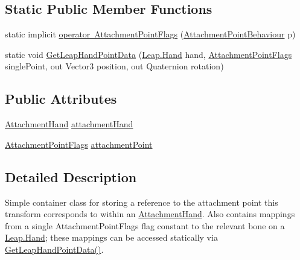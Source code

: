 \subsection*{Static Public Member Functions}
\begin{DoxyCompactItemize}
\item 
static implicit \mbox{\hyperlink{class_leap_1_1_unity_1_1_attachments_1_1_attachment_point_behaviour_af2b9cb4aa7bc97715ba572180d450538}{operator Attachment\+Point\+Flags}} (\mbox{\hyperlink{class_leap_1_1_unity_1_1_attachments_1_1_attachment_point_behaviour}{Attachment\+Point\+Behaviour}} p)
\item 
static void \mbox{\hyperlink{class_leap_1_1_unity_1_1_attachments_1_1_attachment_point_behaviour_a80f3e3a2fa250a6b955a50f471b4a498}{Get\+Leap\+Hand\+Point\+Data}} (\mbox{\hyperlink{class_leap_1_1_hand}{Leap.\+Hand}} hand, \mbox{\hyperlink{namespace_leap_1_1_unity_1_1_attachments_a4b32b38f722ad110fcd5a817256e09ab}{Attachment\+Point\+Flags}} single\+Point, out Vector3 position, out Quaternion rotation)
\end{DoxyCompactItemize}
\subsection*{Public Attributes}
\begin{DoxyCompactItemize}
\item 
\mbox{\hyperlink{class_leap_1_1_unity_1_1_attachments_1_1_attachment_hand}{Attachment\+Hand}} \mbox{\hyperlink{class_leap_1_1_unity_1_1_attachments_1_1_attachment_point_behaviour_a290ccc63d725900866edb0e951869be9}{attachment\+Hand}}
\item 
\mbox{\hyperlink{namespace_leap_1_1_unity_1_1_attachments_a4b32b38f722ad110fcd5a817256e09ab}{Attachment\+Point\+Flags}} \mbox{\hyperlink{class_leap_1_1_unity_1_1_attachments_1_1_attachment_point_behaviour_a7344e503f10013a48b805d012054f6a1}{attachment\+Point}}
\end{DoxyCompactItemize}


\subsection{Detailed Description}
Simple container class for storing a reference to the attachment point this transform corresponds to within an \mbox{\hyperlink{class_leap_1_1_unity_1_1_attachments_1_1_attachment_hand}{Attachment\+Hand}}. Also contains mappings from a single Attachment\+Point\+Flags flag constant to the relevant bone on a \mbox{\hyperlink{class_leap_1_1_hand}{Leap.\+Hand}}; these mappings can be accessed statically via \mbox{\hyperlink{class_leap_1_1_unity_1_1_attachments_1_1_attachment_point_behaviour_a80f3e3a2fa250a6b955a50f471b4a498}{Get\+Leap\+Hand\+Point\+Data()}}. 

